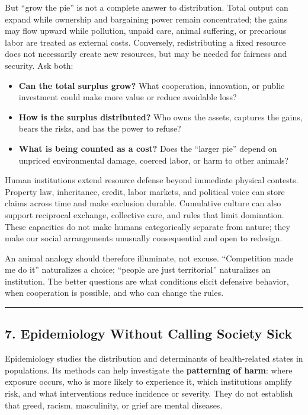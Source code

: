 \documentclass[
  11pt,
  letterpaper,
]{article}
\providecommand{\tightlist}{%
  \setlength{\itemsep}{0pt}\setlength{\parskip}{0pt}}
\begin{document}
But ``grow the pie'' is not a complete answer to distribution. Total
output can expand while ownership and bargaining power remain
concentrated; the gains may flow upward while pollution, unpaid care,
animal suffering, or precarious labor are treated as external costs.
Conversely, redistributing a fixed resource does not necessarily create
new resources, but may be needed for fairness and security. Ask both:

\begin{itemize}
\tightlist
\item
  \textbf{Can the total surplus grow?} What cooperation, innovation, or
  public investment could make more value or reduce avoidable loss?
\item
  \textbf{How is the surplus distributed?} Who owns the assets, captures
  the gains, bears the risks, and has the power to refuse?
\item
  \textbf{What is being counted as a cost?} Does the ``larger pie''
  depend on unpriced environmental damage, coerced labor, or harm to
  other animals?
\end{itemize}

Human institutions extend resource defense beyond immediate physical
contests. Property law, inheritance, credit, labor markets, and
political voice can store claims across time and make exclusion durable.
Cumulative culture can also support reciprocal exchange, collective
care, and rules that limit domination. These capacities do not make
humans categorically separate from nature; they make our social
arrangements unusually consequential and open to redesign.

An animal analogy should therefore illuminate, not excuse. ``Competition
made me do it'' naturalizes a choice; ``people are just territorial''
naturalizes an institution. The better questions are what conditions
elicit defensive behavior, when cooperation is possible, and who can
change the rules.

\begin{center}\rule{0.5\linewidth}{0.5pt}\end{center}

\subsection{7. Epidemiology Without Calling Society
Sick}\label{epidemiology-without-calling-society-sick}

Epidemiology studies the distribution and determinants of health-related
states in populations. Its methods can help investigate the
\textbf{patterning of harm}: where exposure occurs, who is more likely
to experience it, which institutions amplify risk, and what
interventions reduce incidence or severity. They do not establish that
greed, racism, masculinity, or grief are mental diseases.
\end{document}
